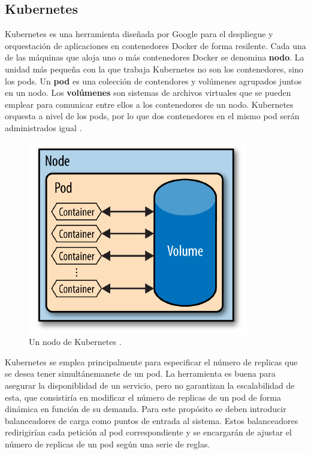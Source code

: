 \documentclass[11pt,spanish,listoffigures]{tfgetsinf}
\begin{document}
\subsection{Kubernetes}

Kubernetes es una herramienta diseñada por Google para el despliegue y orquestación de aplicaciones en contenedores Docker de forma resilente. Cada una de las máquinas que aloja uno o más contenedores Docker se denomina \textbf{nodo}. La unidad más pequeña con la que trabaja Kubernetes no son los contenedores, sino los pods. Un \textbf{pod} es una colección de contendores y volúmenes agrupados juntos en un nodo. Los \textbf{volúmenes} son sistemas de archivos virtuales que se pueden emplear para comunicar entre ellos a los contenedores de un nodo. Kubernetes orquesta a nivel de los pods, por lo que dos contenedores en el mismo pod serán administrados igual \cite{Rensin2015}.

\begin{figure}[h]
\centering
\includegraphics[scale=0.7]{kubernetes}
\caption{Un nodo de Kubernetes \cite{Rensin2015}.}
\end{figure}

Kubernetes se emplea principalmente para especificar el número de replicas que se desea tener simultánemanete de un pod. La herramienta es buena para asegurar la disponiblidad de un servicio, pero no garantizan la escalabilidad de esta, que consistiría en modificar el número de replicas de un pod de forma dinámica en función de su demanda. Para este propósito se deben introducir balanceadores de carga como puntos de entrada al sistema. Estos balanceadores redirigirían cada petición al pod correspondiente y se encargarán de ajustar el número de replicas de un pod según una serie de reglas.
\end{document}
